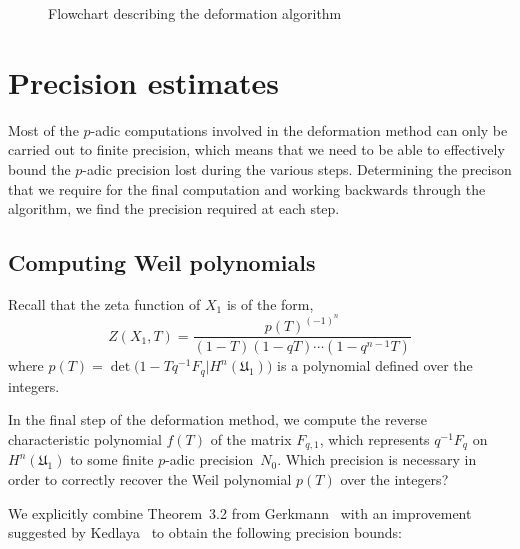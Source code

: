 \begin{figure}[H]
\caption{Flowchart describing the deformation algorithm}
\label{fig:deformation}
\end{figure}

\section{Precision estimates}

Most of the $p$-adic computations involved in the deformation 
method can only be carried out to finite precision, which means 
that we need to be able to effectively bound the $p$-adic 
precision lost during the various steps.  Determining the precison 
that we require for the final computation and working backwards 
through the algorithm, we find the precision required at 
each step.

\subsection{Computing Weil polynomials}

Recall that the zeta function of $X_1$ is of the form,
\begin{equation*}
Z(X_1,T) = \frac{p(T)^{(-1)^n}}{(1 - T) (1 - qT) \dotsm (1 - q^{n-1}T)}
\end{equation*}
where $p(T) = \det \bigl( 1 - T q^{-1} F_q | H^n(\mathfrak{U}_1) \bigr)$ 
is a polynomial defined over the integers.

In the final step of the deformation method, we compute the 
reverse characteristic polynomial $f(T)$ of the matrix $F_{q,1}$, 
which represents $q^{-1} F_q$ on $H^n(\mathfrak{U}_1)$ to some finite 
$p$-adic precision~$N_0$.  Which precision is necessary in order to 
correctly recover the Weil polynomial $p(T)$ over the integers?

We explicitly combine Theorem~{3.2} from Gerkmann~\citep{Gerkmann2007} 
with an improvement suggested by Kedlaya~\citep[Lemma~1.2.3]{Kedlaya2011}
to obtain the following precision bounds:

